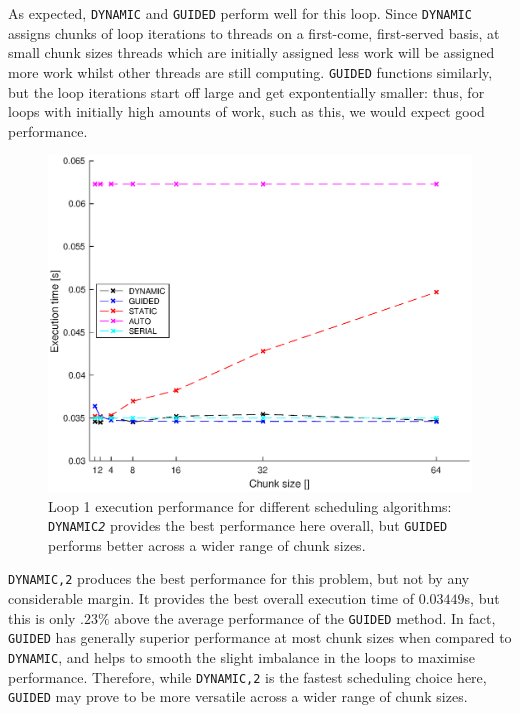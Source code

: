 \documentclass{article} %
\newcommand{\tp}{\texttt}
\begin{document}
As expected, \tp{DYNAMIC} and \tp{GUIDED} perform well for this loop.
Since \tp{DYNAMIC} assigns chunks of loop iterations to threads on a first-come, first-served basis, at small chunk sizes threads which are initially assigned less work will be assigned more work whilst other threads are still computing. 
\tp{GUIDED} functions similarly, but the loop iterations start off large and get expontentially smaller: thus, for loops with initially high amounts of work, such as this, we would expect good performance.

\begin{figure}
    \centering
    \includegraphics[height=.35\textheight]{part1_plots/all_part1.eps}
    \caption{Loop 1 execution performance for different scheduling algorithms: \tp{DYNAMIC\textit{2}} provides the best performance here overall, but \tp{GUIDED} performs better across a wider range of chunk sizes.}
    \label{fig:loop1results}
\end{figure}

\tp{DYNAMIC,2} produces the best performance for this problem, but not by any considerable margin.
It provides the best overall execution time of $0.03449$s, but this is only $.23\%$ above the average performance of the \tp{GUIDED} method. 
In fact, \tp{GUIDED} has generally superior performance at most chunk sizes when compared to \tp{DYNAMIC}, and helps to smooth the slight imbalance in the loops to maximise performance.
Therefore, while \tp{DYNAMIC,2} is the fastest scheduling choice here, \tp{GUIDED} may prove to be more versatile across a wider range of chunk sizes.
\end{document}
